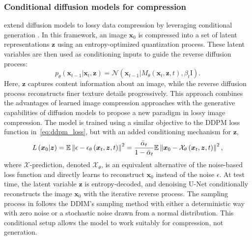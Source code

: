 \subsubsection{Conditional diffusion models for compression}
extend diffusion models to lossy data compression by leveraging conditional generation \cite{Yang2023cd}. In this framework, an image $\boldsymbol{x}_0$ is compressed into a set of latent representations $\boldsymbol{z}$ using an entropy-optimized quantization process. These latent variables are then used as conditioning inputs to guide the reverse diffusion process:
\begin{equation}\label{eq:cd_reverse}
    p_\theta\left(\boldsymbol{x}_{t-1}|\boldsymbol{x}_t, \boldsymbol{z}\right)=\mathcal{N}\left(\boldsymbol{x}_{t-1}|M_\theta\left(\boldsymbol{x}_t, \boldsymbol{z}, t\right),\beta_t\boldsymbol{\mathrm{I}}\right).
\end{equation}
Here, $\boldsymbol{z}$ captures content information about an image, while the reverse diffusion process reconstructs finer texture details progressively. This approach combines the advantages of learned image compression approaches \cite{Balle2017,Balle2018,Minnen2018} with the generative capabilities of diffusion models to propose a new paradigm in lossy image compression. The model is trained using a similar objective to the DDPM loss function in~\eqref{eq:ddpm_loss}, but with an added conditioning mechanism for $\boldsymbol{z}$,
\begin{equation}\label{eq:cd_loss}
    L\left(\boldsymbol{x}_0|\boldsymbol{z}\right)=\mathbb{E}\left\|\epsilon-\epsilon_\theta\left(\boldsymbol{x}_t,\boldsymbol{z}, t\right)\right\|^2=\frac{\Bar{\alpha}_t}{1-\Bar{\alpha}_t}\mathbb{E}\left\|\boldsymbol{x}_0-\mathcal{X}_\theta\left(\boldsymbol{x}_t,\boldsymbol{z}, t\right)\right\|^2,
\end{equation}
where $\mathcal{X}$-prediction, denoted $\mathcal{X}_\theta$, is an equivalent alternative of the noise-based loss function and directly learns to reconstruct $\boldsymbol{x}_0$ instead of the noise $\epsilon$. At test time, the latent variable $\boldsymbol{z}$ is entropy-decoded, and denoising U-Net conditionally reconstructs the image $\boldsymbol{x}_0$ with the iterative reverse process. The sampling process in \cite{Yang2023cd} follows the DDIM's sampling method \cite{Song2021} with either a deterministic way with zero noise or a stochastic noise drawn from a normal distribution. This conditional setup allows the model to work suitably for compression, not generation.


